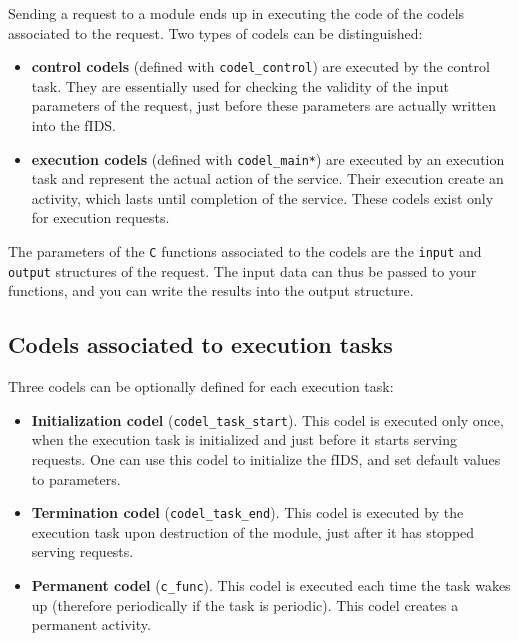 Sending a request to a module ends up in executing the code of the codels
associated to the request. Two types of codels can be distinguished:

\begin{itemize}
\item {\bf control codels} (defined with {\tt codel\_control}) are
executed by the control task. They are essentially  used for checking the
validity    of the input parameters of    the  request, just before these
parameters are actually written into the fIDS.

\item {\bf execution codels} (defined with {\tt codel\_main*}) are
executed by  an execution task  and  represent the actual  action of  the
service.    Their execution  create   an  activity,   which lasts   until
completion  of  the service.   These  codels  exist   only for  execution
requests.
\end{itemize}

The parameters of the {\tt C} functions associated to  the codels are the
{\tt  input} and {\tt output} structures  of  the request. The input data
can thus be passed to your functions, and you can  write the results into
the output structure.


\subsection{Codels associated to execution tasks}

Three codels can be optionally defined for each execution task:

\begin{itemize}
\item {\bf Initialization codel} ({\tt codel\_task\_start}). This codel is
executed  only once, when  the  execution task   is initialized and  just
before it starts serving requests.  One can use  this codel to initialize
the fIDS, and set default values to parameters.

\item {\bf Termination codel} ({\tt codel\_task\_end}). This codel is
executed by the execution task upon destruction of the module, just after
it has stopped serving requests.

\item {\bf Permanent codel} ({\tt c\_func}). This codel is executed
each  time  the task  wakes  up (therefore  periodically  if  the task is
periodic). This codel creates a permanent activity.
\end{itemize}



